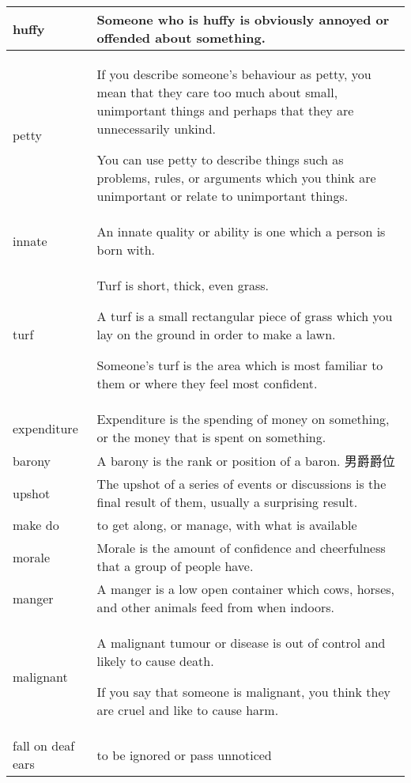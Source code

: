 \documentclass{article}
\begin{document}
\begin{center}
\begin{longtable}{|l|p{9cm}|}
\hline
huffy
&
Someone who is huffy is obviously annoyed or offended about something.
\\

\hline
petty
&
If you describe someone's behaviour as petty, you mean that they care too much about small, unimportant things and perhaps that they are unnecessarily unkind.
\par
You can use petty to describe things such as problems, rules, or arguments which you think are unimportant or relate to unimportant things.
\\

\hline
innate
&
An innate quality or ability is one which a person is born with.
\\

\hline
turf
&
Turf is short, thick, even grass.
\par
A turf is a small rectangular piece of grass which you lay on the ground in order to make a lawn.
\par
Someone's turf is the area which is most familiar to them or where they feel most confident.
\\

\hline
expenditure
&
Expenditure is the spending of money on something, or the money that is spent on something.
\\

\hline
barony
&
A barony is the rank or position of a baron. 男爵爵位
\\

\hline
upshot
&
The upshot of a series of events or discussions is the final result of them, usually a surprising result.
\\


\hline
make do
&
to get along, or manage, with what is available
\\

\hline
morale
&
Morale is the amount of confidence and cheerfulness that a group of people have.
\\

\hline
manger
&
A manger is a low open container which cows, horses, and other animals feed from when indoors.
\\

\hline
malignant
&
A malignant tumour or disease is out of control and likely to cause death.
\par
If you say that someone is malignant, you think they are cruel and like to cause harm.
\\


\hline
fall on deaf ears
&
to be ignored or pass unnoticed
\\


\end{longtable}
\end{center}
\end{document}
